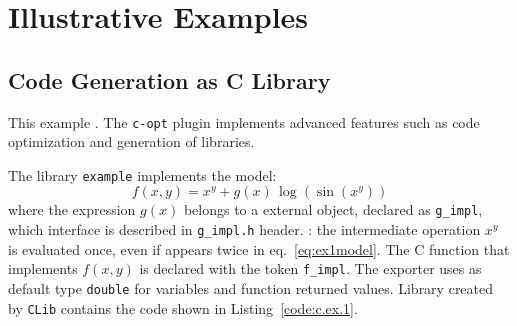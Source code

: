 
\section{Illustrative Examples}
\label{sec:examples}

\subsection{Code Generation as C Library}
This example . The \texttt{c-opt} plugin implements advanced features such as code optimization and generation of libraries.

The library \texttt{example} implements the model:
\begin{equation}
\label{eq:ex1model}
f(x, y) = x^y + g(x)\, \log(\sin(x^y))
\end{equation}
where the expression $g(x)$ belongs to a external object, declared as \texttt{g\_impl}, which interface is described in \texttt{g\_impl.h} header. : the intermediate operation $x^y$ is evaluated once, even if appears twice in eq.~\ref{eq:ex1model}. The C function that implements $f(x,y)$ is declared with the token \texttt{f\_impl}. The exporter uses as default type \texttt{double} for variables and function returned values. Library created by \texttt{CLib} contains the code shown in Listing~\ref{code:c.ex.1}.

\noindent%


\noindent%
\begin{minipage}{.5\textwidth}

\end{minipage}\hfill
\begin{minipage}{.5\textwidth}

\end{minipage}

